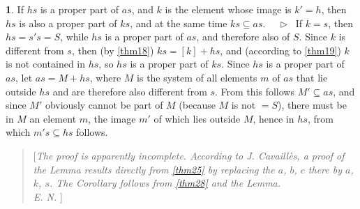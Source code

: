 \documentclass[leqno,hidelinks]{article}
\theoremstyle{definition}
\newtheorem*{hilfssatz}{\protect\hilfssatzname}
\newcommand{\hilfssatzname}{}
\renewcommand{\hilfssatzname}{Hilfssatz}%
\renewcommand{\hilfssatzname}{Lemma}%
\newcommand\Beweis{\medskip \newline $ \phantom{'.'} \rhd \ $}%
\newcommand{\partof}{\subseteq}
\newcommand{\sref}[1]{\underline{\ref{#1}}}%
\begin{document}
\begin{paracol}{2}
\begin{hilfssatz}
If $hs$ is a proper part of $as$, and $k$ is the element whose image is $k'=h$,
then $hs$ is also a proper part of $ks$, and at the same time $ks \partof as$.
\Beweis
If $k=s$, then $hs=s's= S$, while $hs$ is a proper part of $as$, and therefore
also of $S$. Since $k$ is different from $s$, then (by \sref{thm18}) $ks = [k]+ hs$,
and (according to \sref{thm19}) $k$ is not contained in $hs$, so $hs$ is a proper
part of $ks$. Since $hs$ is a proper part of $as$, let $as = M + hs$, where $M$
is the system of all elements $m$ of $as$ that lie outside $hs$ and are therefore
also different from $s$. From this follows $M' \partof as$, and since $M'$ obviously
cannot be part of $M$ (because $M$ is not $= S$), there must be in $M$ an element
$m$, the image $m'$ of which lies outside $M$, hence in $hs$, from which
$m's \partof hs$ follows.
\end{hilfssatz}

\begin{quote}
[\emph{The proof is apparently incomplete. According to J. Cavaillès, a proof of
the Lemma results directly from \sref{thm25} by replacing the $a$, $b$, $c$ there
by $a$, $k$, $s$. The Corollary follows from \sref{thm28} and the Lemma.
\ \\
E. N.
}]\end{quote}



\end{paracol}
\end{document}
